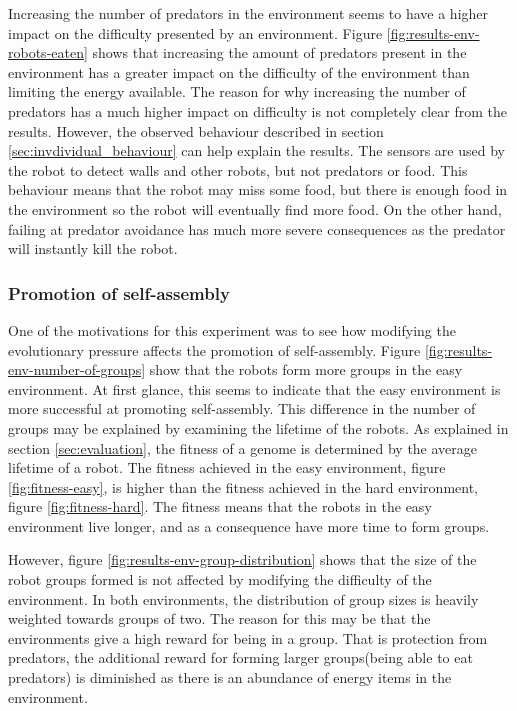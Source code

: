 Increasing the number of predators in the environment seems to have a higher impact on the difficulty presented by an environment.
Figure \ref{fig:results-env-robots-eaten} shows that increasing the amount of predators present in the environment has a greater impact on the difficulty of the environment than limiting the energy available.
The reason for why increasing the number of predators has a much higher impact on difficulty is not completely clear from the results.
However, the observed behaviour described in section \ref{sec:invdividual_behaviour} can help explain the results.
The sensors are used by the robot to detect walls and other robots, but not predators or food.
This behaviour means that the robot may miss some food, but there is enough food in the environment so the robot will eventually find more food.
On the other hand, failing at predator avoidance has much more severe consequences as the predator will instantly kill the robot.

\subsubsection{Promotion of self-assembly}
One of the motivations for this experiment was to see how modifying the evolutionary pressure affects the promotion of self-assembly.
Figure \ref{fig:results-env-number-of-groups} show that the robots form more groups in the easy environment.
At first glance, this seems to indicate that the easy environment is more successful at promoting self-assembly.
This difference in the number of groups may be explained by examining the lifetime of the robots.
As explained in section \ref{sec:evaluation}, the fitness of a genome is determined by the average lifetime of a robot.
The fitness achieved in the easy environment, figure \ref{fig:fitness-easy}, is higher than the fitness achieved in the hard environment, figure \ref{fig:fitness-hard}.
The fitness means that the robots in the easy environment live longer, and as a consequence have more time to form groups.

However, figure \ref{fig:results-env-group-distribution} shows that the size of the robot groups formed is not affected by modifying the difficulty of the environment.
In both environments, the distribution of group sizes is heavily weighted towards groups of two.
The reason for this may be that the environments give a high reward for being in a group.
That is protection from predators, the additional reward for forming larger groups(being able to eat predators) is diminished as there is an abundance of energy items in the environment.


